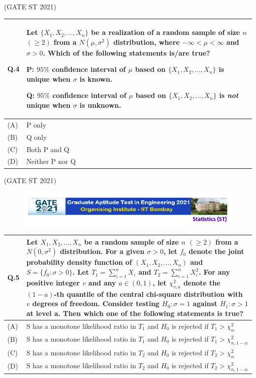\documentclass[journal,12pt,onecolumn]{IEEEtran}
\theoremstyle{remark}
\begin{document}
\bigskip
\hfill (GATE ST 2021)
\\

\begin{tabular}{|p{1cm}|p{12.5cm}|}
\hline
 
\textbf{Q.4} & \textbf{Let $\{X_1, X_2, \dots, X_n\}$ be a realization of a random sample of size $n$ $(\geq 2)$ from a $N(\mu, \sigma^2)$ distribution, where $-\infty < \mu < \infty$ and $\sigma > 0$. Which of the following statements is/are true? }

P: $95\%$ confidence interval of $\mu$ based on $\{X_1, X_2, \dots, X_n\}$ is unique when $\sigma$ is known.  

Q: $95\%$ confidence interval of $\mu$ based on $\{X_1, X_2,\dots, X_n\}$ is \textit{not} unique when $\sigma$ is unknown.
\\
\hline
(A) & P only \\
\hline
(B) & Q only \\
\hline
(C) & Both P and Q \\
\hline
(D) & Neither P nor Q \\ 
\hline
\end{tabular}

\bigskip
\hfill (GATE ST 2021)
\\

\newpage

\begin{figure}
\huge\centering
    \includegraphics[width=1\linewidth]{figs/0.png}
\end{figure}

\begin{tabular}{|p{1cm}|p{12.5cm}|}
\hline
\textbf{Q.5} &\textbf{ Let $X_1, X_2, \dots, X_n$ be a random sample of size $n$ $(\geq 2)$ from a $N(0, \sigma^2)$ distribution. For a given $\sigma > 0$, let $f_0$ denote the joint probability density function of $(X_1, X_2, \dots, X_n)$ and $S = \{f_0 : \sigma > 0\}$. Let $T_1 = \sum_{i=1}^n X_i$ and $T_2 = \sum_{i=1}^n X_i^2$. For any positive integer $v$ and any $a \in (0,1)$, let $\chi^2_{v,a}$ denote the $(1-a)$-th quantile of the central chi-square distribution with $v$ degrees of freedom. Consider testing $H_0 : \sigma = 1$ against $H_1 : \sigma > 1$ at level a. Then which one of the following statements is true? } \\ 
\hline

(A) & S has a monotone likelihood ratio in $T_1$ and $H_0$ is rejected if $T_1 > \chi^2_\alpha$ \\
\hline
(B) & S has a monotone likelihood ratio in $T_1$ and $H_0$ is rejected if $T_1 > \chi^2_{n,1-\alpha}$ \\
\hline
(C) & S has a monotone likelihood ratio in $T_2$ and $H_0$ is rejected if $T_2 > \chi^2_{\alpha}$ \\ 
\hline
(D) & S has a monotone likelihood ratio in $T_2$ and $H_0$ is rejected if $T_2 > \chi^2_{n,1-\alpha}$ \\
\hline
\end{tabular}
\end{document}
